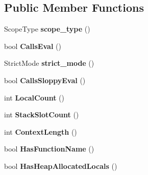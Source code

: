\subsection*{Public Member Functions}
\begin{DoxyCompactItemize}
\item 
\hypertarget{classv8_1_1internal_1_1_scope_info_ae733615765dcb18d495f47a17f71d20a}{}Scope\+Type {\bfseries scope\+\_\+type} ()\label{classv8_1_1internal_1_1_scope_info_ae733615765dcb18d495f47a17f71d20a}

\item 
\hypertarget{classv8_1_1internal_1_1_scope_info_a432170e24589a5c5f9d1ad5bb1832623}{}bool {\bfseries Calls\+Eval} ()\label{classv8_1_1internal_1_1_scope_info_a432170e24589a5c5f9d1ad5bb1832623}

\item 
\hypertarget{classv8_1_1internal_1_1_scope_info_a2e59eed5e81a9225dd7596fe00b20d37}{}Strict\+Mode {\bfseries strict\+\_\+mode} ()\label{classv8_1_1internal_1_1_scope_info_a2e59eed5e81a9225dd7596fe00b20d37}

\item 
\hypertarget{classv8_1_1internal_1_1_scope_info_a84ec03d497d0f9fbb97e0f6419c7f8c5}{}bool {\bfseries Calls\+Sloppy\+Eval} ()\label{classv8_1_1internal_1_1_scope_info_a84ec03d497d0f9fbb97e0f6419c7f8c5}

\item 
\hypertarget{classv8_1_1internal_1_1_scope_info_a8c5ea06d07d096ba90f9508307aeba96}{}int {\bfseries Local\+Count} ()\label{classv8_1_1internal_1_1_scope_info_a8c5ea06d07d096ba90f9508307aeba96}

\item 
\hypertarget{classv8_1_1internal_1_1_scope_info_a29109c40318ea4adf095f4e295d39a46}{}int {\bfseries Stack\+Slot\+Count} ()\label{classv8_1_1internal_1_1_scope_info_a29109c40318ea4adf095f4e295d39a46}

\item 
\hypertarget{classv8_1_1internal_1_1_scope_info_aef66422f96d9e2414e05178e28dc3220}{}int {\bfseries Context\+Length} ()\label{classv8_1_1internal_1_1_scope_info_aef66422f96d9e2414e05178e28dc3220}

\item 
\hypertarget{classv8_1_1internal_1_1_scope_info_adaaee44a533df7b23de313ce5b0ee0c8}{}bool {\bfseries Has\+Function\+Name} ()\label{classv8_1_1internal_1_1_scope_info_adaaee44a533df7b23de313ce5b0ee0c8}

\item 
\hypertarget{classv8_1_1internal_1_1_scope_info_a1208fd2b730b876332c68dbf842495b3}{}bool {\bfseries Has\+Heap\+Allocated\+Locals} ()\label{classv8_1_1internal_1_1_scope_info_a1208fd2b730b876332c68dbf842495b3}


\end{DoxyCompactItemize}
